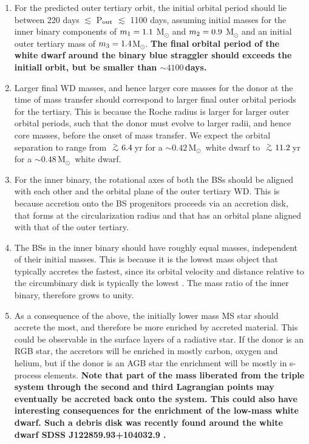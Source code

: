 \documentclass[twocolumn]{aastex62}
\newcommand{\MSun}{\mbox{M$_\odot$}}
\def\apgt{\ {\raise-.5ex\hbox{$\buildrel>\over\sim$}}\ }
\begin{document}
\begin{enumerate}

\item For the predicted outer tertiary orbit, the initial orbital
  period should lie between 220 days $\lesssim$ P$_{\rm out}$
  $\lesssim$ 1100 days, assuming initial masses for the inner binary
  components of $m_{\rm 1} = 1.1$ M$_{\odot}$ and $m_{\rm 2} = 0.9$
  M$_{\odot}$ and an initial outer tertiary mass of $m_{\rm 3} = 1.4
  $M$_{\odot}$. \textbf{The final orbital period of the white dwarf
    around the binary blue straggler should exceeds the initiall
    orbit, but be smaller than $\sim 4100$\,days.}

\item Larger final WD masses, and hence larger core masses for the
  donor at the time of mass transfer should correspond to larger final
  outer orbital periods for the tertiary.  This is because the Roche
  radius is larger for larger outer orbital periods, such that the
  donor must evolve to larger radii, and hence core masses, before the
  onset of mass transfer. We expect the orbital separation to range
  from $\apgt 6.4$\,yr for a $\sim 0.42$\,\MSun\, white dwarf to
  $\apgt 11.2$\,yr for a $\sim 0.48$\,\MSun\, white dwarf.

\item For the inner binary, the rotational axes of both the BSs should
  be aligned with each other and the orbital plane of the outer
  tertiary WD.  This is because accretion onto the BS progenitors
  proceeds via an accretion disk, that forms at the circularization
  radius and that has an orbital plane aligned with that of the outer
  tertiary.

\item The BSs in the inner binary should have roughly equal masses,
  independent of their initial masses.  This is because it is the
  lowest mass object that typically accretes the fastest, since its
  orbital velocity and distance relative to the circumbinary disk is
  typically the lowest
  \citep[e.g.][]{2000MNRAS.314...33B,2012ApJ...749..118S,2017MNRAS.466.1170M}.
  The mass ratio of the inner binary, therefore grows to unity.  

\item As a consequence of the above, the initially lower mass MS star
  should accrete the most, and therefore be more enriched by accreted
  material.  This could be observable in the surface layers of a
  radiative star.  If the donor is an RGB star, the accretors will be
  enriched in mostly carbon, oxygen and helium, but if the donor is an
  AGB star the enrichment will be mostly in s-process elements.
  \textbf{Note that part of the mass liberated from the triple system
    through the second and third Lagrangian points may eventually be
    accreted back onto the system.  This could also have interesting
    consequences for the enrichment of the low-mass white dwarf.  Such
    a debris disk was recently found around the white dwarf SDSS
    J122859.93+104032.9 \cite{Manseretal2019}.
  }


\end{enumerate}
\end{document}
